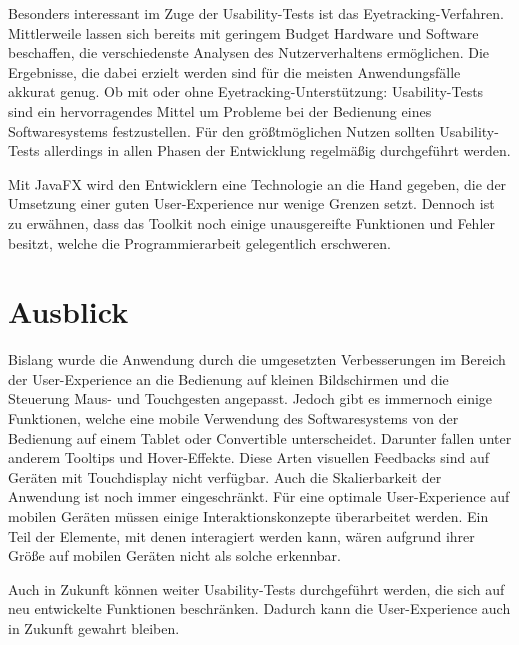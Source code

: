 Besonders interessant im Zuge der Usability-Tests ist das Eyetracking-Verfahren. Mittlerweile lassen sich bereits mit geringem Budget Hardware und Software beschaffen, die verschiedenste Analysen des Nutzerverhaltens ermöglichen. Die Ergebnisse, die dabei erzielt werden sind für die meisten Anwendungsfälle akkurat genug. Ob mit oder ohne Eyetracking-Unterstützung: Usability-Tests sind ein hervorragendes Mittel um Probleme bei der Bedienung eines Softwaresystems festzustellen. Für den größtmöglichen Nutzen sollten Usability-Tests allerdings in allen Phasen der Entwicklung regelmäßig durchgeführt werden.\par
Mit JavaFX wird den Entwicklern eine Technologie an die Hand gegeben, die der Umsetzung einer guten User-Experience nur wenige Grenzen setzt. Dennoch ist zu erwähnen, dass das Toolkit noch einige unausgereifte Funktionen und Fehler besitzt, welche die Programmierarbeit gelegentlich erschweren.\par
\section{Ausblick}
Bislang wurde die Anwendung durch die umgesetzten Verbesserungen im Bereich der User-Experience an die Bedienung auf kleinen Bildschirmen und die Steuerung Maus- und Touchgesten angepasst. Jedoch gibt es immernoch einige Funktionen, welche eine mobile Verwendung des Softwaresystems von der Bedienung auf einem Tablet oder Convertible unterscheidet. Darunter fallen unter anderem Tooltips und Hover-Effekte. Diese Arten visuellen Feedbacks sind auf Geräten mit Touchdisplay nicht verfügbar. Auch die Skalierbarkeit der Anwendung ist noch immer eingeschränkt. Für eine optimale User-Experience auf mobilen Geräten müssen einige Interaktionskonzepte überarbeitet werden. Ein Teil der Elemente, mit denen interagiert werden kann, wären aufgrund ihrer Größe auf mobilen Geräten nicht als solche erkennbar.\par
Auch in Zukunft können weiter Usability-Tests durchgeführt werden, die sich auf neu entwickelte Funktionen beschränken. Dadurch kann die User-Experience auch in Zukunft gewahrt bleiben.\par